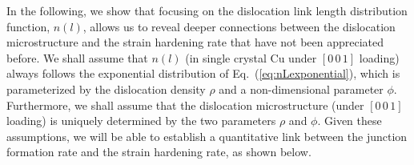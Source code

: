 \documentclass[%
reprint,
 amsmath,amssymb,
 aps,
superscriptaddress,
]{revtex4-1}
\begin{document}
In the following, we show that focusing on the dislocation link length distribution
function, $n(l)$, allows us to reveal deeper connections between the dislocation
microstructure and the strain hardening rate that have not been appreciated before.
%
We shall assume that $n(l)$ (in single crystal Cu under $[0\,0\,1]$ loading)
always follows the exponential distribution of Eq.~(\ref{eq:nLexponential}),
which is parameterized by the dislocation density $\rho$ and a non-dimensional
parameter $\phi$.
%
Furthermore, we shall assume that the dislocation microstructure (under
$[0\,0\,1]$ loading) is uniquely determined by the two parameters $\rho$ and
$\phi$.
%
Given these assumptions, we will be able to establish a quantitative link 
between the junction formation rate and the strain hardening rate, as shown 
below.
\end{document}
